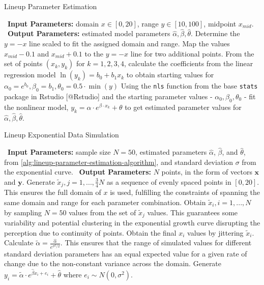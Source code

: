 \documentclass[12pt]{article}
\begin{document}
\begin{algorithm}
  \caption{Lineup Parameter Estimation}\label{alg:lineup-parameter-estimation-algorithm}
  \begin{algorithmic}[1]
    \Statex \hspace*{-1em}\textbullet~\textbf{Input Parameters:} domain $x\in[0,20]$, range $y\in[10,100]$, midpoint $x_{mid}$.
    \Statex \hspace*{-1em}\textbullet~\textbf{Output Parameters:} estimated model parameters $\hat\alpha, \hat\beta, \hat\theta$.
    \State Determine the $y=-x$ line scaled to fit the assigned domain and range.
    \State Map the values $x_{mid} - 0.1$ and $x_{mid} + 0.1$ to the $y=-x$ line for two additional points.
    \State From the set of points $(x_k, y_k)$ for $k = 1,2,3,4$, calculate the coefficients from the linear regression model $\ln(y_k) = b_0 +b_1x_k$ to obtain starting values for $\alpha_0 = e^{b_0}, \beta_0 =  b_1, \theta_0 = 0.5\cdot \min(y)$
    \State Using the \texttt{nls} function from the base \texttt{stats} package in Rstudio [@Rstudio] and the starting parameter values - $\alpha_0, \beta_0, \theta_0$ - fit the nonlinear model, $y_k = \alpha\cdot e^{\beta\cdot x_k}+\theta$ to get estimated parameter values for $\hat\alpha, \hat\beta, \hat\theta.$
  \end{algorithmic}
\end{algorithm}

\begin{algorithm}
  \caption{Lineup Exponential Data Simulation}\label{alg:lineup-exponential-data-simulation-algorithm}
  \begin{algorithmic}[1]
    \Statex \hspace*{-1em}\textbullet~\textbf{Input Parameters:} sample size $N = 50$, estimated parameters $\hat\alpha$, $\hat\beta$, and $\hat\theta$, from \cref{alg:lineup-parameter-estimation-algorithm}, and standard deviation $\sigma$ from the exponential curve.
    \Statex \hspace*{-1em}\textbullet~\textbf{Output Parameters:} $N$ points, in the form of vectors $\mathbf{x}$ and $\mathbf{y}$.
    \State Generate $\tilde x_j, j = 1,..., \frac{3}{4}N$ as a sequence of evenly spaced points in $[0,20]$. This ensures the full domain of $x$ is used, fulfilling the constraints of spanning the same domain and range for each parameter combination.
    \State Obtain $\tilde x_i, i = 1,...,N$ by sampling $N = 50$ values from the set of $\tilde x_j$ values. This guarantees some variability and potential clustering in the exponential growth curve disrupting the perception due to continuity of points.
    \State Obtain the final $x_i$ values by jittering $\tilde x_i$.
    \State Calculate $\tilde\alpha = \frac{\hat\alpha}{e^{\sigma^2/2}}.$ This ensures that the range of simulated values for different standard deviation parameters has an equal expected value for a given rate of change due to the non-constant variance across the domain.
    \State Generate $y_i = \tilde\alpha\cdot e^{\hat\beta x_i + e_i}+\hat\theta$ where $e_i\sim N(0,\sigma^2).$
  \end{algorithmic}
\end{algorithm}
\end{document}
